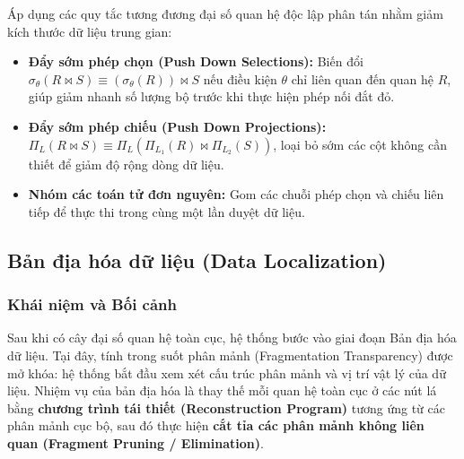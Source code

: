 \documentclass[12pt,a4paper]{report}
\begin{document}
\begin{enumerate}[leftmargin=0.8cm, topsep=2pt, itemsep=2pt]
    Áp dụng các quy tắc tương đương đại số quan hệ độc lập phân tán nhằm giảm kích thước dữ liệu trung gian:
    \begin{itemize}
        \item \textbf{Đẩy sớm phép chọn (Push Down Selections):} Biến đổi $\sigma_\theta(R \bowtie S) \equiv (\sigma_\theta(R)) \bowtie S$ nếu điều kiện $\theta$ chỉ liên quan đến quan hệ $R$, giúp giảm nhanh số lượng bộ trước khi thực hiện phép nối đắt đỏ.
        \item \textbf{Đẩy sớm phép chiếu (Push Down Projections):} $\Pi_L(R \bowtie S) \equiv \Pi_L(\Pi_{L_1}(R) \bowtie \Pi_{L_2}(S))$, loại bỏ sớm các cột không cần thiết để giảm độ rộng dòng dữ liệu.
        \item \textbf{Nhóm các toán tử đơn nguyên:} Gom các chuỗi phép chọn và chiếu liên tiếp để thực thi trong cùng một lần duyệt dữ liệu.
    \end{itemize}
\end{enumerate}

\subsection{Bản địa hóa dữ liệu (Data Localization)}
\subsubsection{Khái niệm và Bối cảnh}
Sau khi có cây đại số quan hệ toàn cục, hệ thống bước vào giai đoạn Bản địa hóa dữ liệu. Tại đây, tính trong suốt phân mảnh (Fragmentation Transparency) được mở khóa: hệ thống bắt đầu xem xét cấu trúc phân mảnh và vị trí vật lý của dữ liệu. Nhiệm vụ của bản địa hóa là thay thế mỗi quan hệ toàn cục ở các nút lá bằng \textbf{chương trình tái thiết (Reconstruction Program)} tương ứng từ các phân mảnh cục bộ, sau đó thực hiện \textbf{cắt tỉa các phân mảnh không liên quan (Fragment Pruning / Elimination)}.
\end{document}

